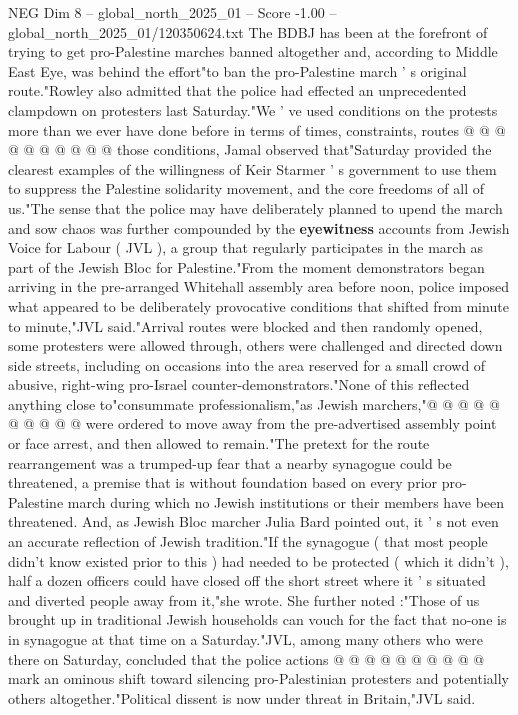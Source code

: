 \begin{textsample}{NEG Dim 8 – global\_north\_2025\_01 – Score -1.00 – global\_north\_2025\_01/120350624.txt}
The BDBJ has been at the forefront of trying to get pro-Palestine marches banned altogether and, according to Middle East Eye, was behind the effort"to ban the pro-Palestine march ' s original route."Rowley also admitted that the police had effected an unprecedented clampdown on protesters last Saturday."We ' ve used conditions on the protests more than we ever have done before in terms of times, constraints, routes @ @ @ @ @ @ @ @ @ @ those conditions, Jamal observed that"Saturday provided the clearest examples of the willingness of Keir Starmer ' s government to use them to suppress the Palestine solidarity movement, and the core freedoms of all of us."The sense that the police may have deliberately planned to upend the march and sow chaos was further compounded by the \textbf{eyewitness} accounts from Jewish Voice for Labour ( JVL ), a group that regularly participates in the march as part of the Jewish Bloc for Palestine."From the moment demonstrators began arriving in the pre-arranged Whitehall assembly area before noon, police imposed what appeared to be deliberately provocative conditions that shifted from minute to minute,"JVL said."Arrival routes were blocked and then randomly opened, some protesters were allowed through, others were challenged and directed down side streets, including on occasions into the area reserved for a small crowd of abusive, right-wing pro-Israel counter-demonstrators."None of this reflected anything close to"consummate professionalism,"as Jewish marchers,"@ @ @ @ @ @ @ @ @ @ were ordered to move away from the pre-advertised assembly point or face arrest, and then allowed to remain."The pretext for the route rearrangement was a trumped-up fear that a nearby synagogue could be threatened, a premise that is without foundation based on every prior pro-Palestine march during which no Jewish institutions or their members have been threatened.
And, as Jewish Bloc marcher Julia Bard pointed out, it ' s not even an accurate reflection of Jewish tradition."If the synagogue ( that most people didn't know existed prior to this ) had needed to be protected ( which it didn't ), half a dozen officers could have closed off the short street where it ' s situated and diverted people away from it,"she wrote.
She further noted :"Those of us brought up in traditional Jewish households can vouch for the fact that no-one is in synagogue at that time on a Saturday."JVL, among many others who were there on Saturday, concluded that the police actions @ @ @ @ @ @ @ @ @ @ mark an ominous shift toward silencing pro-Palestinian protesters and potentially others altogether."Political dissent is now under threat in Britain,"JVL said.

\end{textsample}
